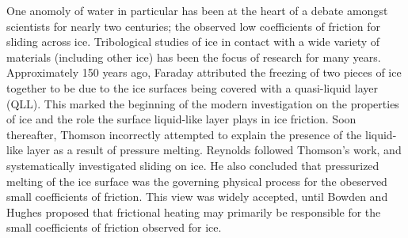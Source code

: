 


One anomoly of water in particular has been at the heart of a debate
amongst scientists for nearly two centuries; the observed low
coefficients of friction for sliding across ice.  Tribological studies of
ice in contact with a wide variety of materials (including other ice)
has been the focus of research for many years.  Approximately 150
years ago, Faraday attributed the freezing of two pieces of ice
together to be due to the ice surfaces being covered with a
quasi-liquid layer (QLL).\cite{Faraday1859} This marked the beginning
of the modern investigation on the properties of ice and the role the
surface liquid-like layer plays in ice friction. Soon thereafter,
Thomson incorrectly attempted to explain the presence of the
liquid-like layer as a result of pressure melting.\cite{Thomson1859}
Reynolds followed Thomson's work, and systematically investigated
sliding on ice. He also concluded that pressurized melting of the ice
surface was the governing physical process for the obeserved small
coefficients of friction.\cite{Reynolds1901} This view was widely
accepted, until Bowden and Hughes proposed that frictional heating may
primarily be responsible for the small coefficients of friction
observed for ice.\cite{Bowden1939}

